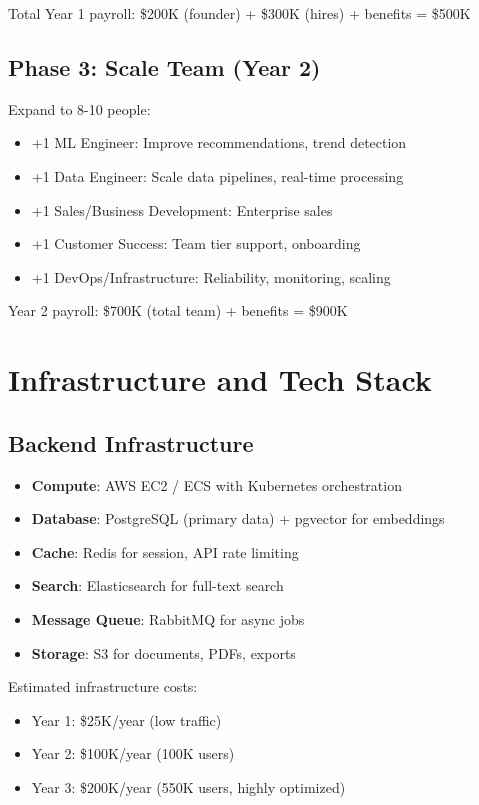 \documentclass{report}
\begin{document}
Total Year 1 payroll: \$200K (founder) + \$300K (hires) + benefits = \$500K

\subsection{Phase 3: Scale Team (Year 2)}

Expand to 8-10 people:

\begin{itemize}
    \item +1 ML Engineer: Improve recommendations, trend detection
    \item +1 Data Engineer: Scale data pipelines, real-time processing
    \item +1 Sales/Business Development: Enterprise sales
    \item +1 Customer Success: Team tier support, onboarding
    \item +1 DevOps/Infrastructure: Reliability, monitoring, scaling
\end{itemize}

Year 2 payroll: \$700K (total team) + benefits = \$900K

\section{Infrastructure and Tech Stack}

\subsection{Backend Infrastructure}

\begin{itemize}
    \item \textbf{Compute}: AWS EC2 / ECS with Kubernetes orchestration
    \item \textbf{Database}: PostgreSQL (primary data) + pgvector for embeddings
    \item \textbf{Cache}: Redis for session, API rate limiting
    \item \textbf{Search}: Elasticsearch for full-text search
    \item \textbf{Message Queue}: RabbitMQ for async jobs
    \item \textbf{Storage}: S3 for documents, PDFs, exports
\end{itemize}

Estimated infrastructure costs:
\begin{itemize}
    \item Year 1: \$25K/year (low traffic)
    \item Year 2: \$100K/year (100K users)
    \item Year 3: \$200K/year (550K users, highly optimized)
\end{itemize}
\end{document}
